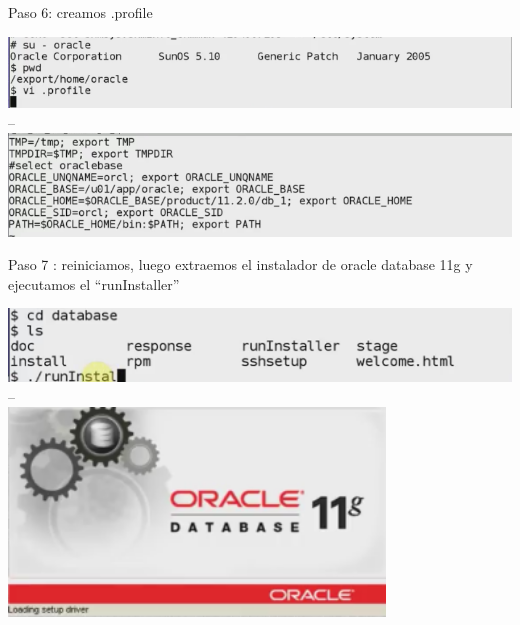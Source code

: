 \documentclass[a4paper,openright,12pt]{book}
\begin{document}
Paso 6: creamos .profile
\begin{center}
\includegraphics[width=15cm]{./solari/7.png}
--\\
\includegraphics[width=15cm]{./solari/8.png}
\end{center}
Paso 7 : reiniciamos, luego extraemos el instalador de oracle database 11g y ejecutamos el “runInstaller”

\begin{center}
\includegraphics[width=15cm]{./solari/9.png}
--\\
\includegraphics[width=10cm]{./solari/10.png}
\end{center}
\end{document}
